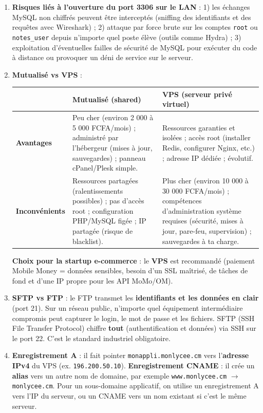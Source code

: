 \documentclass[11pt]{article}
\begin{document}
\begin{corrige}[Exercice 2]
\begin{enumerate}
    \item \textbf{Risques liés à l'ouverture du port 3306 sur le LAN} : 1) les échanges MySQL non chiffrés peuvent être interceptés (sniffing des identifiants et des requêtes avec Wireshark) ; 2) attaque par force brute sur les comptes \texttt{root} ou \texttt{notes\_user} depuis n'importe quel poste élève (outils comme Hydra) ; 3) exploitation d'éventuelles failles de sécurité de MySQL pour exécuter du code à distance ou provoquer un déni de service sur le serveur.
    \item \textbf{Mutualisé vs VPS} :
    \begin{center}
    \begin{tabularx}{\linewidth}{|l|X|X|}\hline
    \rowcolor{popblueL} & \textbf{Mutualisé (shared)} & \textbf{VPS (serveur privé virtuel)} \\\hline
    \textbf{Avantages} & Peu cher (environ 2 000 à 5 000 FCFA/mois) ; administré par l'hébergeur (mises à jour, sauvegardes) ; panneau cPanel/Plesk simple. & Ressources garanties et isolées ; accès root (installer Redis, configurer Nginx, etc.) ; adresse IP dédiée ; évolutif. \\\hline
    \textbf{Inconvénients} & Ressources partagées (ralentissements possibles) ; pas d'accès root ; configuration PHP/MySQL figée ; IP partagée (risque de blacklist). & Plus cher (environ 10 000 à 30 000 FCFA/mois) ; compétences d'administration système requises (sécurité, mises à jour, pare-feu, supervision) ; sauvegardes à ta charge. \\\hline
    \end{tabularx}
    \end{center}
    \textbf{Choix pour la startup e-commerce} : le \textbf{VPS} est recommandé (paiement Mobile Money = données sensibles, besoin d'un SSL maîtrisé, de tâches de fond et d'une IP propre pour les API MoMo/OM).
    \item \textbf{SFTP vs FTP} : le FTP transmet les \textbf{identifiants et les données en clair} (port 21). Sur un réseau public, n'importe quel équipement intermédiaire compromis peut capturer le login, le mot de passe et les fichiers. SFTP (SSH File Transfer Protocol) chiffre \textbf{tout} (authentification et données) via SSH sur le port 22. C'est le standard industriel obligatoire.
    \item \textbf{Enregistrement A} : il fait pointer \texttt{monappli.monlycee.cm} vers l'\textbf{adresse IPv4} du VPS (ex. \texttt{196.200.50.10}). \textbf{Enregistrement CNAME} : il crée un \textbf{alias} vers un autre nom de domaine, par exemple \texttt{www.monlycee.cm} $\rightarrow$ \texttt{monlycee.cm}. Pour un sous-domaine applicatif, on utilise un enregistrement A vers l'IP du serveur, ou un CNAME vers un nom existant si c'est le même serveur.
\end{enumerate}
\end{corrige}
\end{document}

